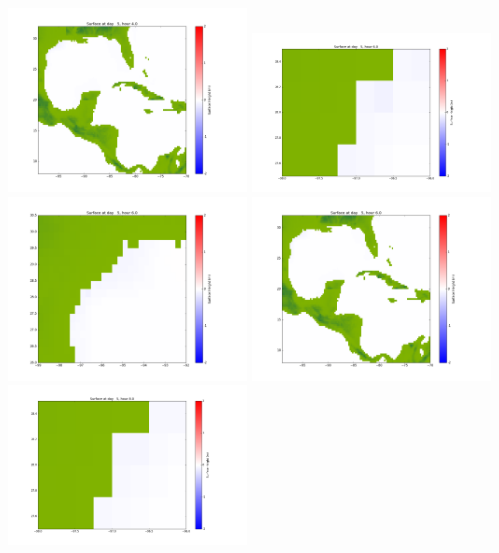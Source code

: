 \documentclass[11pt]{article}
\begin{document}
\vskip 10pt 
\includegraphics[width=0.475\textwidth]{frame0086fig1003.png}
\vskip 10pt 
\includegraphics[width=0.475\textwidth]{frame0087fig1001.png}
\includegraphics[width=0.475\textwidth]{frame0087fig1002.png}
\vskip 10pt 
\includegraphics[width=0.475\textwidth]{frame0087fig1003.png}
\vskip 10pt 
\includegraphics[width=0.475\textwidth]{frame0088fig1001.png}
\end{document}
